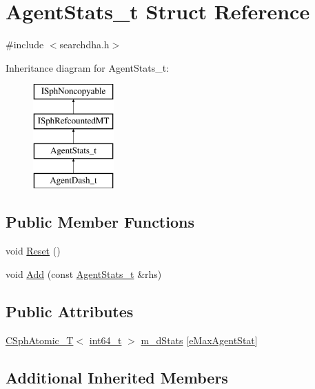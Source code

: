 \hypertarget{structAgentStats__t}{\section{Agent\-Stats\-\_\-t Struct Reference}
\label{structAgentStats__t}
}


{\ttfamily \#include $<$searchdha.\-h$>$}

Inheritance diagram for Agent\-Stats\-\_\-t\-:\begin{figure}[H]
\begin{center}
\leavevmode
\includegraphics[height=4.000000cm]{structAgentStats__t}
\end{center}
\end{figure}
\subsection*{Public Member Functions}
\begin{DoxyCompactItemize}
\item 
void \hyperlink{structAgentStats__t_ae45b47b4c07ffe725014a72c41faede7}{Reset} ()
\item 
void \hyperlink{structAgentStats__t_a0e6a0e0405d9bdd3889acd2adc05ce56}{Add} (const \hyperlink{structAgentStats__t}{Agent\-Stats\-\_\-t} \&rhs)
\end{DoxyCompactItemize}
\subsection*{Public Attributes}
\begin{DoxyCompactItemize}
\item 
\hyperlink{classCSphAtomic__T}{C\-Sph\-Atomic\-\_\-\-T}$<$ \hyperlink{sphinxstd_8h_a996e72f71b11a5bb8b3b7b6936b1516d}{int64\-\_\-t} $>$ \hyperlink{structAgentStats__t_ada4aeafb1eb84f324b8f07693761d1c8}{m\-\_\-d\-Stats} \mbox{[}\hyperlink{searchdha_8h_af72fe71e6601be343fec3a3111ba7ebbaf9e9435f9437aa6166b0f38554398c46}{e\-Max\-Agent\-Stat}\mbox{]}
\end{DoxyCompactItemize}
\subsection*{Additional Inherited Members}


